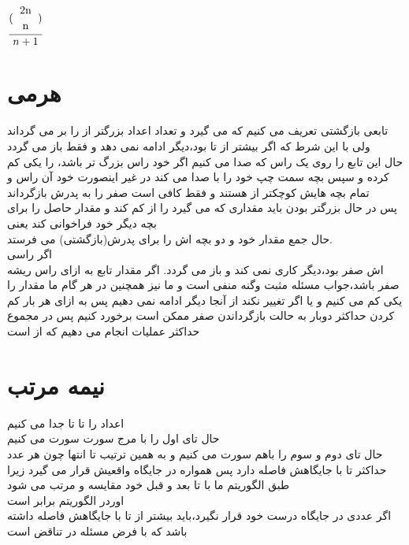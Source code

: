 \documentclass[a4paper]{article}
\begin{document}
\begin{latin}
$\dfrac{(
\begin{tabular}{c c} 
 2n \\ [0.5ex] 
 n
 \end{tabular}
)}{n+1}$
 \end{latin}
\newpage
\section*{هرمی}
تابعی بازگشتی تعریف می کنیم که 
می گیرد و تعداد اعداد بزرگتر از 
را بر می گرداند ولی با این شرط که اگر بیشتر از 
تا بود،دیگر ادامه نمی دهد و فقط باز می گردد\\
حال این تابع را روی یک راس که صدا می کنیم اگر خود راس بزرگ تر باشد،
را یکی کم کرده و سپس بچه سمت چپ خود را با
صدا می کند
در غیر اینصورت خود آن راس و تمام بچه هایش کوچکتر از
هستند و فقط کافی است صفر را به پدرش بازگرداند\\
پس در حال بزرگتر بودن باید
مقداری که می گیرد را از 
کم کند
و مقدار حاصل را برای بچه دیگر خود فراخوانی  کند
یعنی
\\
حال جمع مقدار خود و دو بچه اش را برای پدرش(بازگشتی) می فرستد.\\
اگر راسی
\\اش صفر بود،دیگر کاری نمی کند و باز می گردد.
اگر مقدار تابع به ازای راس ریشه صفر باشد،جواب مسئله مثبت وگنه منفی است و ما نیز 
همچنین در هر گام ما مقدار 
را یکی کم می کنیم و یا اگر تغییر نکند از آنجا دیگر ادامه نمی دهیم
پس به ازای هر بار کم کردن حداکثر دوبار به حالت بازگرداندن صفر ممکن است برخورد کنیم
پس در مجموع حداکثر 
عملیات انجام می دهیم
که از 
است
\newpage
\section*{نیمه مرتب}
اعداد را 
تا 
تا 
جدا می کنیم\\
حال 
تای اول را با مرج سورت سورت می کنیم\\
حال 
تای دوم و سوم را باهم سورت می کنیم و به همین ترتیب تا انتها
چون هر عدد حداکثر
تا با جایگاهش فاصله دارد پس همواره در جایگاه واقعیش قرار می گیرد زیرا طبق الگوریتم ما با 
تا بعد و قبل خود مقایسه و مرتب می شود\\
اوردر الگوریتم برابر
است\\
اگر عددی در جایگاه درست خود قرار نگیرد،باید بیشتر از 
تا با جایگاهش فاصله داشته باشد که با فرض مسئله در تناقض است
\end{document}
